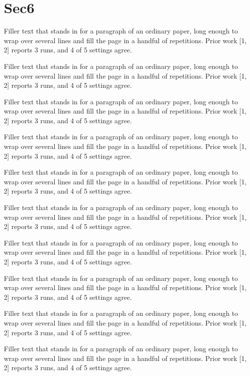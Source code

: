 \documentclass{article}
\begin{document}
\section{Sec6}
Filler text that stands in for a paragraph of an ordinary paper, long enough to wrap over several lines and fill the page in a handful of repetitions. Prior work [1, 2] reports 3 runs, and 4 of 5 settings agree.\par
Filler text that stands in for a paragraph of an ordinary paper, long enough to wrap over several lines and fill the page in a handful of repetitions. Prior work [1, 2] reports 3 runs, and 4 of 5 settings agree.\par
Filler text that stands in for a paragraph of an ordinary paper, long enough to wrap over several lines and fill the page in a handful of repetitions. Prior work [1, 2] reports 3 runs, and 4 of 5 settings agree.\par
Filler text that stands in for a paragraph of an ordinary paper, long enough to wrap over several lines and fill the page in a handful of repetitions. Prior work [1, 2] reports 3 runs, and 4 of 5 settings agree.\par
Filler text that stands in for a paragraph of an ordinary paper, long enough to wrap over several lines and fill the page in a handful of repetitions. Prior work [1, 2] reports 3 runs, and 4 of 5 settings agree.\par
Filler text that stands in for a paragraph of an ordinary paper, long enough to wrap over several lines and fill the page in a handful of repetitions. Prior work [1, 2] reports 3 runs, and 4 of 5 settings agree.\par
Filler text that stands in for a paragraph of an ordinary paper, long enough to wrap over several lines and fill the page in a handful of repetitions. Prior work [1, 2] reports 3 runs, and 4 of 5 settings agree.\par
Filler text that stands in for a paragraph of an ordinary paper, long enough to wrap over several lines and fill the page in a handful of repetitions. Prior work [1, 2] reports 3 runs, and 4 of 5 settings agree.\par
Filler text that stands in for a paragraph of an ordinary paper, long enough to wrap over several lines and fill the page in a handful of repetitions. Prior work [1, 2] reports 3 runs, and 4 of 5 settings agree.\par
Filler text that stands in for a paragraph of an ordinary paper, long enough to wrap over several lines and fill the page in a handful of repetitions. Prior work [1, 2] reports 3 runs, and 4 of 5 settings agree.\par
\end{document}
